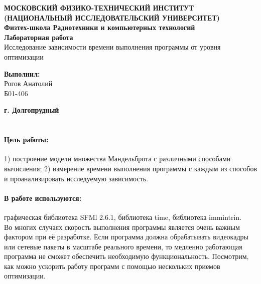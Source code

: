 \documentclass[12pt, letterpaper]{article}
\begin{document}
    \begin{titlepage}
        \begin{center}
            \large\textbf{МОСКОВСКИЙ ФИЗИКО-ТЕХНИЧЕСКИЙ ИНСТИТУТ (НАЦИОНАЛЬНЫЙ ИССЛЕДОВАТЕЛЬСКИЙ УНИВЕРСИТЕТ)}\\
            \large\textbf{Физтех-школа Радиотехники и компьютерных технологий}\\
            \vspace{8cm}
            \Large\textbf{Лабораторная работа}\\
            \large{Исследование зависимости времени выполнения программы от уровня оптимизации}\\
            \vspace{5cm}
        \end{center}
        \begin{flushright}
            \large\textbf{Выполнил:}\\
            \large{Рогов Анатолий}\\
            \large{Б01-406}\\
        \end{flushright}
        \begin{center}
            \vfill
            \large\textbf{г. Долгопрудный}\\
            \large\textbf{\the \year}\\
        \end{center}
    \end{titlepage}

    \paragraph{Цель работы:}1) построение модели множества Мандельброта с различными способами вычисления; 2) измерение времени выполнения программы с каждым из способов и проанализировать исследуемую зависимость.
    \paragraph{В работе используются:}графическая библиотека SFMl 2.6.1, библиотека time, библиотека immintrin.\\

    Во многих случаях скорость выполнения программы является очень важным фактором при её разработке. Если программа должна обрабатывать видеокадры или сетевые пакеты в масштабе реального времени, то медленно работающая программа не сможет обеспечить необходимую функциональность. Посмотрим, как можно ускорить работу программ с помощью нескольких приемов оптимизации.
\end{document}
